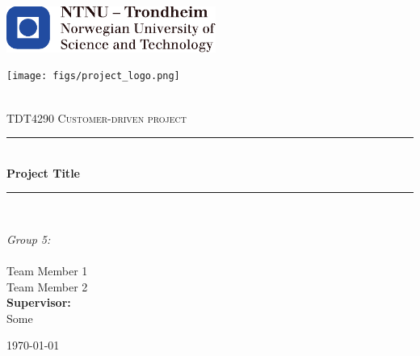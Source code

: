 \begin{titlepage}
\centering

\begin{center}
    \includegraphics[height=1.5cm]{figs/ntnu_logo.pdf}\\[1cm] %
\end{center}

\begin{center}
    \texttt{[image: figs/project\_logo.png]}\\[1cm]
\end{center}

\begin{center}

\newcommand{\myauthor}{Team Member 1 \\ Team Member 2} 
\newcommand{\mytitle}{Project Title}
\newcommand{\mygroupnumber}{5} %

~\\[1.5cm]

\textsc{\Large TDT4290 Customer-driven project }\\[0.5cm]

\hrule ~\\[0.2cm]
{\huge \bfseries \mytitle}\\[0.5cm]		%
\hrule ~\\[1.5cm]



\begin{minipage}{0.4\textwidth}
    \centering
	\large
		\emph{Group \mygroupnumber:}\\~\\
		\myauthor\\
		\vspace{2.5cm}
		\vspace{1.5cm}
		\textbf{Supervisor:}  \\ Some  %
\end{minipage}

\vfill

{\large \today}

\end{center}
\end{titlepage}


\thispagestyle{empty}
